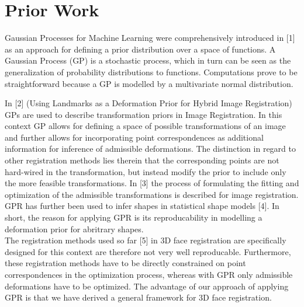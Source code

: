 \section{Prior Work}
Gaussian Processes for Machine Learning were comprehensively introduced in [1]
as an approach for defining a prior distribution over a space of functions. A Gaussian Process (GP) is a stochastic process, which in turn can be seen as the generalization of probability distributions to functions. Computations prove to be straightforward because a GP is modelled by a multivariate normal distribution.\begin{comment}In the Graphics and Vision Group at the University of Basel Gaussian Processes have so far been used to describe transformation priors in Image
Registration\end{comment} In
[2] (Using Landmarks as a Deformation Prior for Hybrid Image Registration) GPs are used to describe transformation priors in Image Registration. In this context GP allows for defining a space of possible transformations of an image and further allows for incorporating point correspondences as additional information for inference of admissible deformations. The distinction in regard to other registration methods lies therein that the corresponding points are not hard-wired in the transformation, but instead modify the prior to include only the
more feasible transformations. In [3] the process of
formulating the fitting and optimization of the admissible transformations is described for image registration. GPR has further been used to infer shapes in statistical shape models [4]. In short, the reason for applying GPR is its reproducability in modelling a deformation prior for abritrary shapes.\\ 
The registration methods used so far [5] in 3D face registration are specifically designed for this context are therefore not very well reproducable. Furthermore, these registration methods have to be directly constrained on point correspondences in the optimization process, whereas with GPR only admissible deformations have to be optimized. The advantage of our approach of applying GPR is that we have derived a general framework for 3D face registration. 
\begin{comment} In effect, the advantage of our application of GPR to the problem of 3D face registration is it is based on a general framework and the based on Bayesian Machine Learning Theory, allows for the easy incorporation of a priori known correspondences and is therefore highly customizable.\end{comment}

